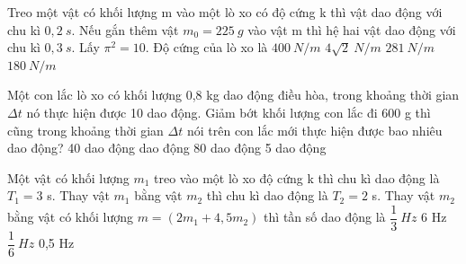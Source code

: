 \begin{vidu} %
Treo một vật có khối lượng m vào một lò xo có độ cứng k thì vật dao động với chu kì $0,2\ s.$ Nếu gắn thêm vật $m_0=225\ g$ vào vật m thì hệ hai vật dao động với chu kì $0,3\ s$. Lấy $\pi^2=10$. Độ cứng của lò xo là
\choice
{$400\ N/m$}
{$4\sqrt{2}\ N/m$}
{$281\ N/m$}
{\True $180\ N/m$}
\end{vidu} %
\begin{vidu}%
Một con lắc lò xo có khối lượng 0,8 kg dao động điều hòa, trong khoảng thời gian  $\Delta t$  nó thực hiện được 10 dao động. Giảm bớt khối lượng con lắc đi 600 g thì cũng trong khoảng thời gian  $\Delta t$  nói trên con lắc mới thực hiện được bao nhiêu dao động?
\choice
{40 dao động}
{ dao động}
{80 dao động}
{5 dao động}
\end{vidu} %
\begin{vidu}%
Một vật có khối lượng $m_1$ treo vào một lò xo độ cứng k thì chu kì dao động là $T_1 = 3$ s. Thay vật $m_1$ bằng vật $m_2$ thì chu kì dao động là $T_2 = 2$ s. Thay vật $m_2$ bằng vật có khối lượng $m=\left(2m_1 + 4,5m_2\right)$ thì tần số dao động là
\choice
{$\dfrac{1}{3}\ Hz$}
{6 Hz}
{\True $\dfrac{1}{6}\ Hz$}
{0,5 Hz}
\end{vidu} %
